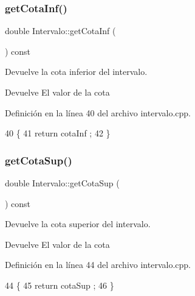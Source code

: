 \subsubsection{\texorpdfstring{get\+Cota\+Inf()}{getCotaInf()}}
{\footnotesize\ttfamily double Intervalo\+::get\+Cota\+Inf (\begin{DoxyParamCaption}{ }\end{DoxyParamCaption}) const}



Devuelve la cota inferior del intervalo. 

\begin{DoxyReturn}{Devuelve}
El valor de la cota 
\end{DoxyReturn}


Definición en la línea 40 del archivo intervalo.\+cpp.


\begin{DoxyCode}
40                                   \{
41     \textcolor{keywordflow}{return} cotaInf ;
42 \}
\end{DoxyCode}
\mbox{\label{classIntervalo_a2dd767a860e4e85ec3d5a44e78884b76}} 
\subsubsection{\texorpdfstring{get\+Cota\+Sup()}{getCotaSup()}}
{\footnotesize\ttfamily double Intervalo\+::get\+Cota\+Sup (\begin{DoxyParamCaption}{ }\end{DoxyParamCaption}) const}



Devuelve la cota superior del intervalo. 

\begin{DoxyReturn}{Devuelve}
El valor de la cota 
\end{DoxyReturn}


Definición en la línea 44 del archivo intervalo.\+cpp.


\begin{DoxyCode}
44                                   \{
45     \textcolor{keywordflow}{return} cotaSup ;
46 \}
\end{DoxyCode}
\mbox{\label{classIntervalo_a3e7cfa7c148a4e60be7040fecf506313}} 
